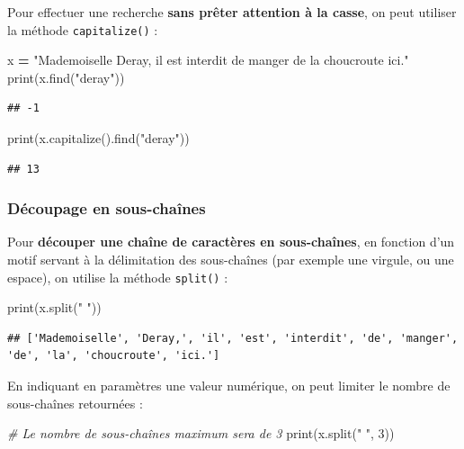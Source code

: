 \documentclass[
  12pt,
]{book}
\newenvironment{Shaded}{\begin{snugshade}}{\end{snugshade}}
\newcommand{\BuiltInTok}[1]{#1}
\newcommand{\CommentTok}[1]{\textcolor[rgb]{0.56,0.35,0.01}{\textit{#1}}}
\newcommand{\DecValTok}[1]{\textcolor[rgb]{0.00,0.00,0.81}{#1}}
\newcommand{\NormalTok}[1]{#1}
\newcommand{\OperatorTok}[1]{\textcolor[rgb]{0.81,0.36,0.00}{\textbf{#1}}}
\newcommand{\StringTok}[1]{\textcolor[rgb]{0.31,0.60,0.02}{#1}}
\numberwithin{equation}{section}
\numberwithin{countremarque}{section}
\begin{document}
Pour effectuer une recherche \textbf{sans prêter attention à la casse}, on peut utiliser la méthode \texttt{capitalize()} :

\begin{Shaded}
\begin{Highlighting}[]
\NormalTok{x }\OperatorTok{=} \StringTok{"Mademoiselle Deray, il est interdit de manger de la choucroute ici."}
\BuiltInTok{print}\NormalTok{(x.find(}\StringTok{"deray"}\NormalTok{))}
\end{Highlighting}
\end{Shaded}

\begin{lstlisting}
## -1
\end{lstlisting}

\begin{Shaded}
\begin{Highlighting}[]
\BuiltInTok{print}\NormalTok{(x.capitalize().find(}\StringTok{"deray"}\NormalTok{))}
\end{Highlighting}
\end{Shaded}

\begin{lstlisting}
## 13
\end{lstlisting}

\subsubsection{Découpage en sous-chaînes}\label{duxe9coupage-en-sous-chauxeenes}

Pour \textbf{découper une chaîne de caractères en sous-chaînes}, en fonction d'un motif servant à la délimitation des sous-chaînes (par exemple une virgule, ou une espace), on utilise la méthode \texttt{split()} :

\begin{Shaded}
\begin{Highlighting}[]
\BuiltInTok{print}\NormalTok{(x.split(}\StringTok{" "}\NormalTok{))}
\end{Highlighting}
\end{Shaded}

\begin{lstlisting}
## ['Mademoiselle', 'Deray,', 'il', 'est', 'interdit', 'de', 'manger', 'de', 'la', 'choucroute', 'ici.']
\end{lstlisting}

En indiquant en paramètres une valeur numérique, on peut limiter le nombre de sous-chaînes retournées :

\begin{Shaded}
\begin{Highlighting}[]
\CommentTok{\# Le nombre de sous{-}chaînes maximum sera de 3}
\BuiltInTok{print}\NormalTok{(x.split(}\StringTok{" "}\NormalTok{, }\DecValTok{3}\NormalTok{))}
\end{Highlighting}
\end{Shaded}
\end{document}
